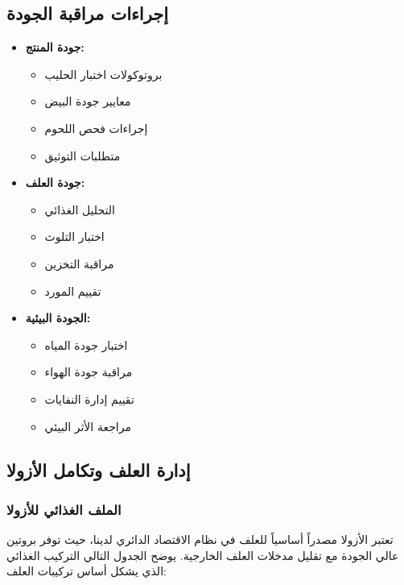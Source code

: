 \subsection{إجراءات مراقبة الجودة}
\begin{itemize}
    \item \textbf{جودة المنتج:}
    \begin{itemize}
        \item بروتوكولات اختبار الحليب
        \item معايير جودة البيض
        \item إجراءات فحص اللحوم
        \item متطلبات التوثيق
    \end{itemize}
    
    \item \textbf{جودة العلف:}
    \begin{itemize}
        \item التحليل الغذائي
        \item اختبار التلوث
        \item مراقبة التخزين
        \item تقييم المورد
    \end{itemize}
    
    \item \textbf{الجودة البيئية:}
    \begin{itemize}
        \item اختبار جودة المياه
        \item مراقبة جودة الهواء
        \item تقييم إدارة النفايات
        \item مراجعة الأثر البيئي
    \end{itemize}
\end{itemize}

\subsection{إدارة العلف وتكامل الأزولا}
\label{sec:feed_management}

\subsubsection{الملف الغذائي للأزولا}
\label{sec:azolla_nutrition}

تعتبر الأزولا مصدراً أساسياً للعلف في نظام الاقتصاد الدائري لدينا، حيث توفر بروتين عالي الجودة مع تقليل مدخلات العلف الخارجية. يوضح الجدول التالي التركيب الغذائي الذي يشكل أساس تركيبات العلف:

